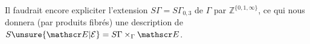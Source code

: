 Il faudrait encore expliciter l'extension $S\Gamma=S\Gamma_{0,3}$ de $\Gamma$ par $\mathbb Z^{\{0,1,\infty\}}$, ce qui nous donnera (par produits fibrés) une description de $S\unsure{\mathscr E|\mathcal E}=S\Gamma\times_\Gamma\mathscr E$.
